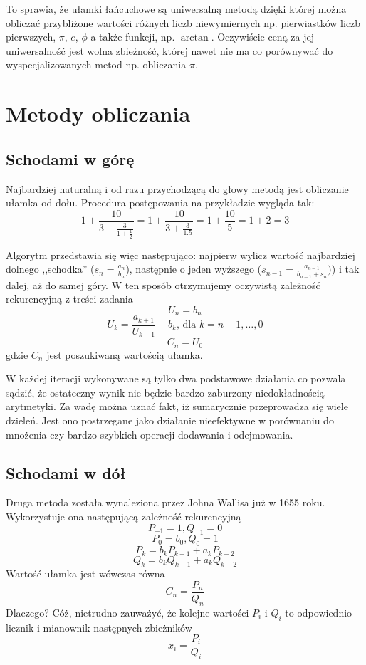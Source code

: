 \documentclass[11pt,leqno]{article}
\begin{document}
To sprawia, że ułamki łańcuchowe są uniwersalną metodą dzięki której można obliczać przybliżone wartości różnych liczb niewymiernych np. pierwiastków liczb pierwszych, $\pi$, $e$, $\phi$ a także funkcji, np. $\arctan$. Oczywiście ceną za jej uniwersalność jest wolna zbieżność, której nawet nie ma co porównywać do wyspecjalizowanych metod np. obliczania $\pi$.



\section{Metody obliczania}


\subsection{Schodami w górę}
Najbardziej naturalną i od razu przychodzącą do głowy metodą jest obliczanie ułamka od dołu. Procedura postępowania na przykładzie wygląda tak:
\[
  1 + \frac{10}{\displaystyle
    3 + \frac{3}{\displaystyle
      1 + \frac{1}{2}
    }
  }
  =
  1 + \frac{10}{\displaystyle
    3 + \frac{3}{\displaystyle
      1.5
    }
  }
  =
  1 + \frac{10}{\displaystyle
    5
  }
  = 1 + 2 = 3
\]

Algorytm przedstawia się więc następująco: najpierw wylicz wartość najbardziej dolnego ,,schodka'' ($s_n = \frac{a_n}{b_n}$), następnie o jeden wyższego ($s_{n - 1} = \frac{a_{n - 1}}{b_{n-1} + s_n})$) i tak dalej, aż do samej góry. W ten sposób otrzymujemy oczywistą zależność rekurencyjną z treści zadania
\[U_n = b_n\]
\[U_k = \frac{a_{k + 1}}{U_{k + 1}} + b_k \text{, dla } k = n - 1, \dots, 0\]
\[C_n = U_0\]
gdzie $C_n$ jest poszukiwaną wartością ułamka.

W każdej iteracji wykonywane są tylko dwa podstawowe działania co pozwala sądzić, że ostateczny wynik nie będzie bardzo zaburzony niedokładnością arytmetyki. Za wadę można uznać fakt, iż sumarycznie przeprowadza się wiele dzieleń. Jest ono postrzegane jako działanie nieefektywne w porównaniu do mnożenia czy bardzo szybkich operacji dodawania i odejmowania.


\subsection{Schodami w dół}
Druga metoda została wynaleziona przez Johna Wallisa już w 1655 roku. Wykorzystuje ona następującą zależność rekurencyjną
\[
P_{-1} = 1, Q_{-1} = 0
\]
\[
P_0 = b_0, Q_0 = 1
\]
\[
P_k = b_k P_{k - 1} + a_k P_{k - 2}
\]
\[
Q_k = b_k Q_{k - 1} + a_k Q_{k - 2}
\]
Wartość ułamka jest wówczas równa 
\[
C_n = \frac{P_n}{Q_n}
\]
Dlaczego? Cóż, nietrudno zauważyć, że kolejne wartości $P_i$ i $Q_i$ to odpowiednio licznik i mianownik następnych zbieżników
\[
x_i = \frac{P_i}{Q_i}
\]
\end{document}
